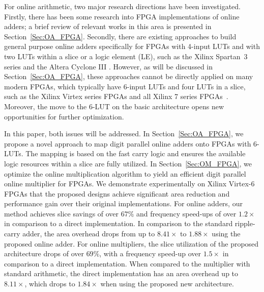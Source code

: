 \documentclass[conference]{IEEEtran}
\begin{document}
For online arithmetic, two major research directions have been investigated. Firstly, there has been some research into FPGA implementations of online adders; a brief review of relevant works in this area is presented in Section~\ref{Sec:OA_FPGA}. Secondly, there are existing approaches to build general purpose online adders specifically for FPGAs with 4-input LUTs and with two LUTs within a slice or a logic element (LE), such as the Xilinx Spartan~3 series \cite{XilinxSpartan} and the Altera Cyclone III \cite{AlteraCyclone}. However, as will be discussed in Section~\ref{Sec:OA_FPGA}, these approaches cannot be directly applied on many modern FPGAs, which typically have 6-input LUTs and four LUTs in a slice, such as the Xilinx Virtex series FPGAs and all Xilinx 7 series FPGAs~\cite{Virtex7}. Moreover, the move to the 6-LUT on the basic architecture opens new opportunities for further optimization.

In this paper, both issues will be addressed. In Section~\ref{Sec:OA_FPGA}, we propose a novel approach to map digit parallel online adders onto FPGAs with 6-LUTs. The mapping is based on the fast carry logic and ensures the available logic resources within a slice are fully utilized. In Section~\ref{Sec:OM_FPGA}, we optimize the online multiplication algorithm to yield an efficient digit parallel online multiplier for FPGAs. We demonstrate experimentally on Xilinx Virtex-6 FPGAs that the proposed designs achieve significant area reduction and performance gain over their original implementations. For online adders, our method achieves  slice savings of over $67\%$ and  frequency speed-ups of over $1.2\times$ in comparison to a direct implementation. In comparison to the standard ripple-carry adder, the area overhead drops from up to $8.41\times$ to $1.88\times$ using the proposed online adder. For online multipliers, the slice utilization of the proposed architecture drops of over $69\%$, with a frequency speed-up over $1.5\times$ in comparison to a direct implementation. When compared to the multiplier with standard arithmetic, the direct implementation has an area overhead up to $8.11\times$, which drops to $1.84\times$ when using the proposed new architecture.
\end{document}
